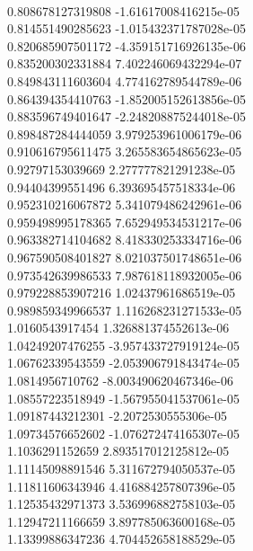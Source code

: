 { \\
0.808678127319808 -1.61617008416215e-05
 \\
0.814551490285623 -1.015432371787028e-05
 \\
0.820685907501172 -4.359151716926135e-06
 \\
0.835200302331884 7.402246069432294e-07
 \\
0.849843111603604 4.774162789544789e-06
 \\
0.864394354410763 -1.852005152613856e-05
 \\
0.883596749401647 -2.248208875244018e-05
 \\
0.898487284444059 3.979253961006179e-06
 \\
0.910616795611475 3.265583654865623e-05
 \\
0.92797153039669 2.277777821291238e-05
 \\
0.94404399551496 6.393695457518334e-06
 \\
0.952310216067872 5.341079486242961e-06
 \\
0.959498995178365 7.652949534531217e-06
 \\
0.963382714104682 8.418330253334716e-06
 \\
0.967590508401827 8.021037501748651e-06
 \\
0.973542639986533 7.987618118932005e-06
 \\
0.979228853907216 1.02437961686519e-05
 \\
0.989859349966537 1.116268231271533e-05
 \\
1.0160543917454 1.326881374552613e-06
 \\
1.04249207476255 -3.957433727919124e-05
 \\
1.06762339543559 -2.053906791843474e-05
 \\
1.0814956710762 -8.003490620467346e-06
 \\
1.08557223518949 -1.567955041537061e-05
 \\
1.09187443212301 -2.2072530555306e-05
 \\
1.09734576652602 -1.076272474165307e-05
 \\
1.1036291152659 2.893517012125812e-05
 \\
1.11145098891546 5.311672794050537e-05
 \\
1.11811606343946 4.416884257807396e-05
 \\
1.12535432971373 3.536996882758103e-05
 \\
1.12947211166659 3.897785063600168e-05
 \\
1.13399886347236 4.704452658188529e-05
 \\
}
